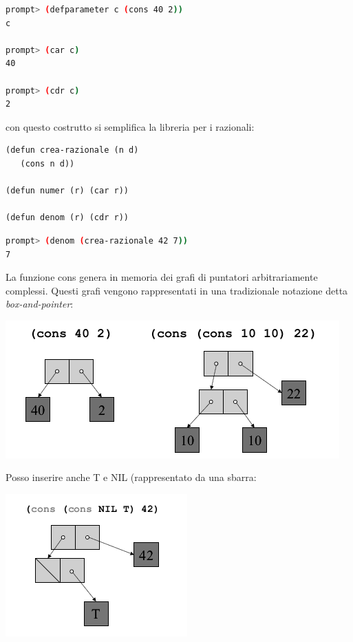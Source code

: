 \documentclass[a4paper,12pt, oneside]{book}
\begin{document}
\begin{shaded}
\begin{lstlisting}[language=bash]
prompt> (defparameter c (cons 40 2))
c

prompt> (car c)
40

prompt> (cdr c)
2
\end{lstlisting}
\end{shaded}
con questo costrutto si semplifica la libreria per i razionali:
\begin{verbatim}
(defun crea-razionale (n d)
   (cons n d))

(defun numer (r) (car r))

(defun denom (r) (cdr r))
\end{verbatim}
\begin{shaded}
\begin{lstlisting}[language=bash]
prompt> (denom (crea-razionale 42 7))
7
\end{lstlisting}
\end{shaded}
La funzione cons genera in memoria dei grafi di puntatori
arbitrariamente complessi. Questi grafi vengono rappresentati in una tradizionale notazione detta \textit{box-and-pointer}:
\begin{center}
\includegraphics[scale=0.7]{img/cons.png}
\end{center}
Posso inserire anche T e NIL (rappresentato da una sbarra:
\begin{center}
\includegraphics[scale=0.7]{img/cons2.png}
\end{center}
\end{document}
